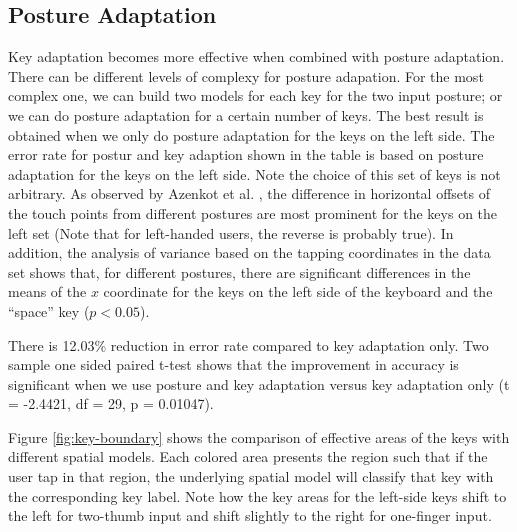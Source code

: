 \documentclass{sigchi}
\begin{document}
\subsection{Posture Adaptation}
Key adaptation becomes more effective when combined with posture adaptation. There can be different levels of
complexy for posture adapation. For the most complex one, we can build two models for each key for the 
two input posture; or we can do posture adaptation for a certain number of keys. The best result is obtained when we only do 
posture adaptation for the keys on the left side. The error rate for postur and key adaption shown in the table is 
based on posture adaptation for the keys on the left side. Note the choice of this set of keys
is not arbitrary. As observed by Azenkot et al. \cite{Azenkot:2012}, the difference in horizontal
offsets of the touch points from different postures are most prominent for the keys on the
left set (Note that for left-handed users, the reverse is probably true). 
In addition, the analysis of variance based on the tapping coordinates in the data set shows
that, for different postures, there are significant differences in the means of
the $x$ coordinate for the keys on the left side of the keyboard and the
``space'' key ($p < 0.05$). 

There is 12.03\% reduction in error rate compared to key adaptation only. Two
sample one sided paired t-test shows that the improvement in accuracy is
significant when we use posture and key adaptation versus key adaptation only (t = -2.4421, df = 29, p = 0.01047).

Figure \ref{fig:key-boundary} shows the comparison of effective areas of the keys
with different spatial models. Each colored area presents the region such that if the
user tap in that region, the underlying spatial model will classify that key with the 
corresponding key label. Note how the key areas for the left-side keys shift to the left
for two-thumb input and shift slightly to the right for one-finger input.
\end{document}
